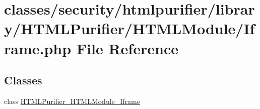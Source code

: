 \hypertarget{Iframe_8php}{\section{classes/security/htmlpurifier/library/\+H\+T\+M\+L\+Purifier/\+H\+T\+M\+L\+Module/\+Iframe.php File Reference}
\label{Iframe_8php}
}
\subsection*{Classes}
\begin{DoxyCompactItemize}
\item 
class \hyperlink{classHTMLPurifier__HTMLModule__Iframe}{H\+T\+M\+L\+Purifier\+\_\+\+H\+T\+M\+L\+Module\+\_\+\+Iframe}
\end{DoxyCompactItemize}

